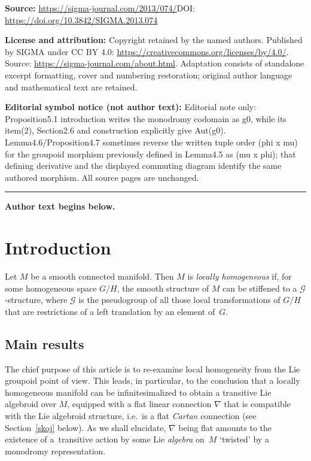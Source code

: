 \documentclass[11pt]{article}
\numberwithin{equation}{section}
\begin{document}
\noindent\textbf{Source:} \url{https://sigma-journal.com/2013/074/}\quad DOI: \url{https://doi.org/10.3842/SIGMA.2013.074}\par
\noindent\textbf{License and attribution:} Copyright retained by the named authors. Published by SIGMA under CC BY 4.0: \url{https://creativecommons.org/licenses/by/4.0/}. Source: \url{https://sigma-journal.com/about.html}. Adaptation consists of standalone excerpt formatting, cover and numbering restoration; original author language and mathematical text are retained.\par
\noindent\textbf{Editorial symbol notice (not author text):} Editorial note only: Proposition5.1 introduction writes the monodromy codomain as g0, while its item(2), Section2.6 and construction explicitly give Aut(g0). Lemma4.6/Proposition4.7 sometimes reverse the written tuple order (phi x mu) for the groupoid morphism previously defined in Lemma4.5 as (mu x phi); that defining derivative and the displayed commuting diagram identify the same authored morphism. All source pages are unchanged.\par
\medskip\hrule\medskip\noindent\textbf{Author text begins below.}\par
\setcounter{section}{0}
\setcounter{subsection}{0}
\setcounter{subsubsection}{0}
\setcounter{TheoremBlaom}{0}
\setcounter{equation}{0}
\section{Introduction}
Let $M$ be a smooth connected manifold. Then $M$ is {\it locally
  homogeneous} if, for some homogeneous space $G/H$, the smooth
structure of $M$ can be stif\/fened to a ${\mathcal G}$-structure, where
${\mathcal G}$ is the pseudogroup of all those local transformations
of $G/H$ that are restrictions of a left translation by an element of~$G$.

\subsection{Main results}\label{goose}%
The chief purpose of this article is to re-examine local homogeneity
from the Lie groupoid point of view. This leads, in particular, to the
conclusion that a locally homogeneous manifold can be
inf\/initesimalized to obtain a transitive Lie algebroid over $M$,
equipped with a f\/lat linear connection $\nabla$ that is compatible
with the Lie algebroid structure, i.e.\ is a f\/lat {\it Cartan}
connection (see Section~\ref{skoj} below). As we shall elucidate, $\nabla$
being f\/lat amounts to the existence of a~transitive action by some Lie
{\em algebra} on~$M$ `twisted' by a monodromy representation.
\end{document}
